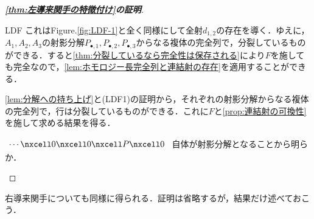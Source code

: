 \begin{proof}[\textbf{\ref{thm:左導来関手の特徴付け}の証明}]
\begin{defiterm}{LDF}
		これはFigure.\ref{fig:LDF-1}と全く同様にして全射$d_{1,2}$の存在を導く．ゆえに，$A_1,A_2,A_3$の射影分解$P_{\bullet,1},P_{\bullet,2},P_{\bullet,3}$からなる複体の完全列で，分裂しているものができる．すると\ref{thm:分裂しているなら完全性は保存される}により$F$を施しても完全なので，\ref{lem:ホモロジー長完全列と連結射の存在}を適用することができる．
		
		\item 
		
		\ref{lem:分解への持ち上げ}と(LDF1)の証明から，それぞれの射影分解からなる複体の完全列で，行は分裂しているものができる．これに$F$と\ref{prop:連結射の可換性}を施して求める結果を得る．
		
		\item $\begin{tikzcd}\cdots\nxcell0\nxcell0\nxcell P\nxcell0
		\end{tikzcd}$
		自体が射影分解となることから明らか．
	\end{defiterm}
\end{proof}

右導来関手についても同様に得られる．証明は省略するが，結果だけ述べておこう．

